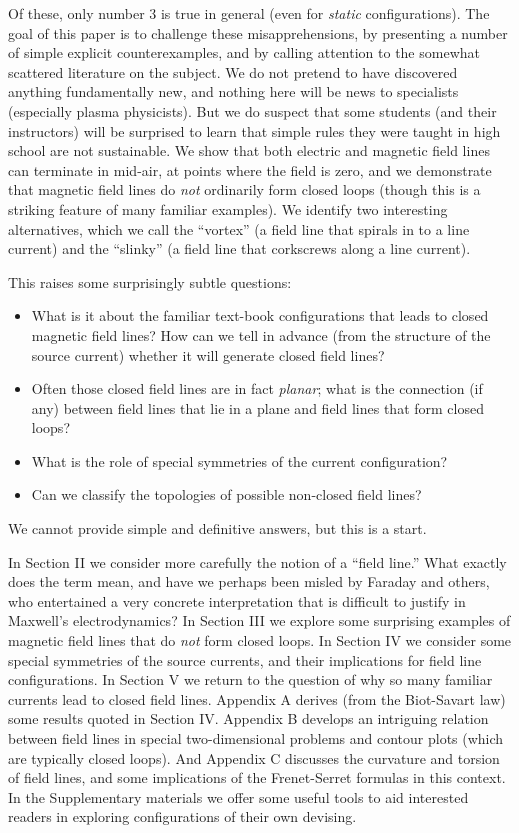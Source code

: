 \documentclass[aps,prb,twocolumn,groupedaddress,noshowpacs,checklength,amsmath]{revtex4-1}
\begin{document}
Of these, only number 3 is true in general\cite{ITIG} (even for {\it static} configurations).  The goal of this paper is to challenge these misapprehensions, by presenting a number of simple explicit counterexamples, and by calling attention to the somewhat scattered literature on the subject.  We do not pretend to have discovered anything fundamentally new, and nothing here will be news to specialists (especially plasma physicists).  But we do suspect that some students (and their instructors) will be surprised to learn that simple rules they were taught in high school are not sustainable.  We show that both electric and magnetic field lines can terminate in mid-air, at points where the field is zero, and we demonstrate that  magnetic field lines do {\it not} ordinarily form closed loops\cite{OFCL} (though this is a striking feature of many familiar examples).  We identify two interesting alternatives, which we call the ``vortex'' (a field line that spirals in to a line current) and the ``slinky'' (a field line that corkscrews along a line current).    

 This raises some surprisingly subtle questions: 
\begin{itemize}
\item What is it about the familiar text-book configurations that leads to closed magnetic field lines?  How can we tell in advance (from the structure of the source current) whether it will generate closed field lines?
\item Often those closed field lines are in fact {\it planar}; what is the connection (if any) between field lines that lie in a plane and field lines that form closed loops?
\item What is the role of special symmetries of the current configuration?
\item Can we classify the topologies of possible non-closed field lines?
\end{itemize}
We cannot provide simple and definitive answers, but this is a start.  


In Section II we consider more carefully the notion of a ``field line.''  What exactly does the term mean, and have we perhaps been misled by Faraday and others, who entertained a 
very concrete interpretation that is difficult to justify in Maxwell's electrodynamics?\cite{JIME}  In Section III we explore some surprising examples of magnetic field lines that do {\it not}
 form closed loops.  In Section IV we consider some special symmetries of the source currents, and their implications for field line configurations.  In Section V we return to the question
  of why so many familiar currents lead to closed field lines.  Appendix A derives (from the Biot-Savart law) some results quoted in Section IV.  Appendix B develops an intriguing relation
  between field lines in special two-dimensional problems and contour plots (which are typically closed loops).  And Appendix C discusses the curvature and torsion of field lines, and 
  some implications of the Frenet-Serret formulas in this context.  In the Supplementary materials we offer some useful tools to aid interested readers in exploring configurations of their 
  own devising.
\end{document}
